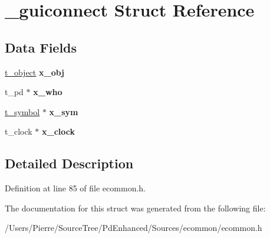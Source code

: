 \hypertarget{struct__guiconnect}{\section{\-\_\-guiconnect Struct Reference}
\label{struct__guiconnect}
}
\subsection*{Data Fields}
\begin{DoxyCompactItemize}
\item 
\hypertarget{struct__guiconnect_aec9b618f42517cd6740f1d37dba87d0a}{\hyperlink{struct__text}{t\-\_\-object} {\bfseries x\-\_\-obj}}\label{struct__guiconnect_aec9b618f42517cd6740f1d37dba87d0a}

\item 
\hypertarget{struct__guiconnect_abbd575f25ecf1fc4fc706f487f7bf433}{t\-\_\-pd $\ast$ {\bfseries x\-\_\-who}}\label{struct__guiconnect_abbd575f25ecf1fc4fc706f487f7bf433}

\item 
\hypertarget{struct__guiconnect_aac75f326262b21717e7625275550a9cc}{\hyperlink{struct__symbol}{t\-\_\-symbol} $\ast$ {\bfseries x\-\_\-sym}}\label{struct__guiconnect_aac75f326262b21717e7625275550a9cc}

\item 
\hypertarget{struct__guiconnect_a959680d1c5640f1e34e835dda3021eef}{t\-\_\-clock $\ast$ {\bfseries x\-\_\-clock}}\label{struct__guiconnect_a959680d1c5640f1e34e835dda3021eef}

\end{DoxyCompactItemize}


\subsection{Detailed Description}


Definition at line 85 of file ecommon.\-h.



The documentation for this struct was generated from the following file\-:\begin{DoxyCompactItemize}
\item 
/\-Users/\-Pierre/\-Source\-Tree/\-Pd\-Enhanced/\-Sources/ecommon/ecommon.\-h\end{DoxyCompactItemize}
